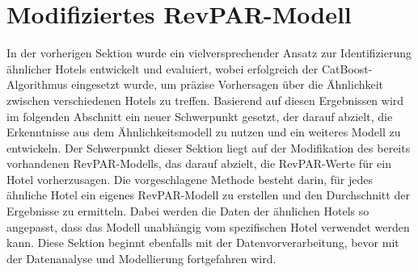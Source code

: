 \section{Modifiziertes RevPAR-Modell}
\label{sec:revpar}
In der vorherigen Sektion wurde ein vielversprechender Ansatz zur Identifizierung ähnlicher Hotels entwickelt und evaluiert, wobei erfolgreich der CatBoost-Algorithmus eingesetzt wurde, um präzise Vorhersagen über die Ähnlichkeit zwischen verschiedenen Hotels zu treffen. Basierend auf diesen Ergebnissen wird im folgenden Abschnitt ein neuer Schwerpunkt gesetzt, der darauf abzielt, die Erkenntnisse aus dem Ähnlichkeitsmodell zu nutzen und ein weiteres Modell zu entwickeln.
\newline
\newline 
Der Schwerpunkt dieser Sektion liegt auf der Modifikation des bereits vorhandenen RevPAR-Modells, das darauf abzielt, die RevPAR-Werte für ein Hotel vorherzusagen. Die vorgeschlagene Methode besteht darin, für jedes ähnliche Hotel ein eigenes RevPAR-Modell zu erstellen und den Durchschnitt der Ergebnisse zu ermitteln. Dabei werden die Daten der ähnlichen Hotels so angepasst, dass das Modell unabhängig vom spezifischen Hotel verwendet werden kann. Diese Sektion beginnt ebenfalls mit der Datenvorverarbeitung, bevor mit der Datenanalyse und Modellierung fortgefahren wird.





